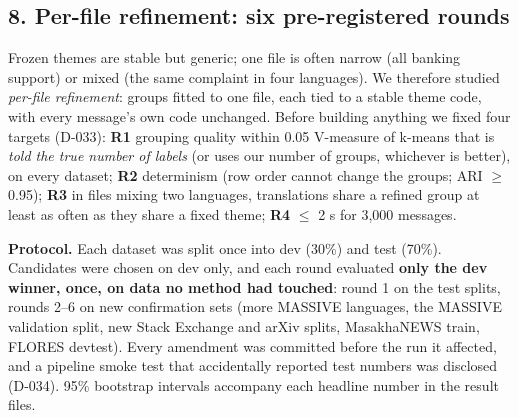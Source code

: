 \documentclass[
  10pt,
]{article}
\begin{document}
\hypertarget{per-file-refinement-six-pre-registered-rounds}{%
\subsection{8. Per-file refinement: six pre-registered
rounds}\label{per-file-refinement-six-pre-registered-rounds}}

Frozen themes are stable but generic; one file is often narrow (all
banking support) or mixed (the same complaint in four languages). We
therefore studied \emph{per-file refinement}: groups fitted to one file,
each tied to a stable theme code, with every message's own code
unchanged. Before building anything we fixed four targets (D-033):
\textbf{R1} grouping quality within 0.05 V-measure of k-means that is
\emph{told the true number of labels} (or uses our number of groups,
whichever is better), on every dataset; \textbf{R2} determinism (row
order cannot change the groups; ARI $\geq$ 0.95); \textbf{R3} in files mixing
two languages, translations share a refined group at least as often as
they share a fixed theme; \textbf{R4} $\leq$ 2 s for 3,000 messages.

\textbf{Protocol.} Each dataset was split once into dev (30\%) and test
(70\%). Candidates were chosen on dev only, and each round evaluated
\textbf{only the dev winner, once, on data no method had touched}: round
1 on the test splits, rounds 2--6 on new confirmation sets (more MASSIVE
languages, the MASSIVE validation split, new Stack Exchange and arXiv
splits, MasakhaNEWS train, FLORES devtest). Every amendment was
committed before the run it affected, and a pipeline smoke test that
accidentally reported test numbers was disclosed (D-034). 95\% bootstrap
intervals accompany each headline number in the result files.
\end{document}
